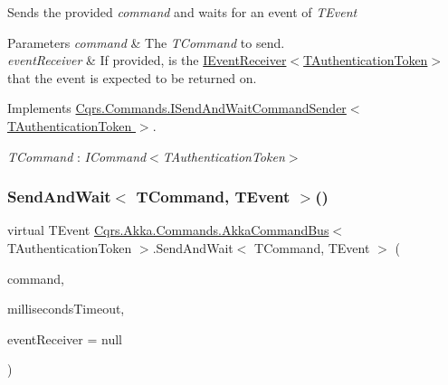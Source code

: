 Sends the provided {\itshape command}  and waits for an event of {\itshape T\+Event}  


\begin{DoxyParams}{Parameters}
{\em command} & The {\itshape T\+Command}  to send.\\
\hline
{\em event\+Receiver} & If provided, is the \hyperlink{interfaceCqrs_1_1Events_1_1IEventReceiver}{I\+Event\+Receiver$<$\+T\+Authentication\+Token$>$} that the event is expected to be returned on.\\
\hline
\end{DoxyParams}


Implements \hyperlink{interfaceCqrs_1_1Commands_1_1ISendAndWaitCommandSender_ab64dd5144f0688b0e23ffe289d4ffa2e_ab64dd5144f0688b0e23ffe289d4ffa2e}{Cqrs.\+Commands.\+I\+Send\+And\+Wait\+Command\+Sender$<$ T\+Authentication\+Token $>$}.

\begin{Desc}
\item[Type Constraints]\begin{description}
\item[{\em T\+Command} : {\em I\+Command$<$T\+Authentication\+Token$>$}]\end{description}
\end{Desc}
\mbox{\label{classCqrs_1_1Akka_1_1Commands_1_1AkkaCommandBus_a4f96fc98615afb9af8fe4d54a398660a_a4f96fc98615afb9af8fe4d54a398660a}} 
\subsubsection{\texorpdfstring{Send\+And\+Wait$<$ T\+Command, T\+Event $>$()}{SendAndWait< TCommand, TEvent >()}\hspace{0.1cm}{\footnotesize\ttfamily [2/6]}}
{\footnotesize\ttfamily virtual T\+Event \hyperlink{classCqrs_1_1Akka_1_1Commands_1_1AkkaCommandBus}{Cqrs.\+Akka.\+Commands.\+Akka\+Command\+Bus}$<$ T\+Authentication\+Token $>$.Send\+And\+Wait$<$ T\+Command, T\+Event $>$ (\begin{DoxyParamCaption}\item[{T\+Command}]{command,  }\item[{int}]{milliseconds\+Timeout,  }\item[{\hyperlink{interfaceCqrs_1_1Events_1_1IEventReceiver}{I\+Event\+Receiver}$<$ T\+Authentication\+Token $>$}]{event\+Receiver = {\ttfamily null} }\end{DoxyParamCaption})\hspace{0.3cm}{\ttfamily [virtual]}}



